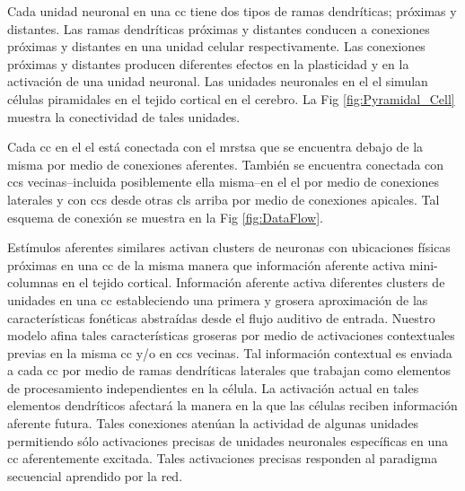 Cada unidad neuronal en una \gls{cc} tiene dos tipos de ramas dendríticas; próximas y distantes. Las ramas dendríticas próximas y distantes conducen a conexiones próximas y distantes en una unidad celular respectivamente. Las conexiones próximas y distantes producen diferentes efectos en la plasticidad y en la activación de una unidad neuronal. Las unidades neuronales en el \gls{el} simulan células piramidales en el tejido cortical en el cerebro. La Fig \ref{fig:Pyramidal_Cell} muestra la conectividad de tales unidades.


Cada \gls{cc} en el \gls{el} está conectada con el \gls{mrstsa} que se encuentra debajo de la misma por medio de conexiones aferentes. También se encuentra conectada con \glspl{cc} vecinas--incluida posiblemente ella misma--en el \gls{el} por medio de conexiones laterales y con \glspl{cc} desde otras \glspl{cl} arriba por medio de conexiones apicales. Tal esquema de conexión se muestra en la Fig \ref{fig:DataFlow}.


Estímulos aferentes similares activan clusters de neuronas con ubicaciones físicas próximas en una \gls{cc} de la misma manera que información aferente activa mini-columnas en el tejido cortical. Información aferente activa diferentes clusters de unidades en una \gls{cc} estableciendo una primera y grosera aproximación de las características fonéticas abstraídas desde el flujo auditivo de entrada. Nuestro modelo afina tales características groseras por medio de activaciones contextuales previas en la misma \gls{cc} y/o en \glspl{cc} vecinas. Tal información contextual es enviada a cada \gls{cc} por medio de ramas dendríticas laterales que trabajan como elementos de procesamiento independientes en la célula. La activación actual en tales elementos dendríticos afectará la manera en la que las células reciben información aferente futura. Tales conexiones atenúan la actividad de algunas unidades permitiendo sólo activaciones precisas de unidades neuronales específicas en una \gls{cc} aferentemente excitada. Tales activaciones precisas responden al paradigma secuencial aprendido por la red. 

